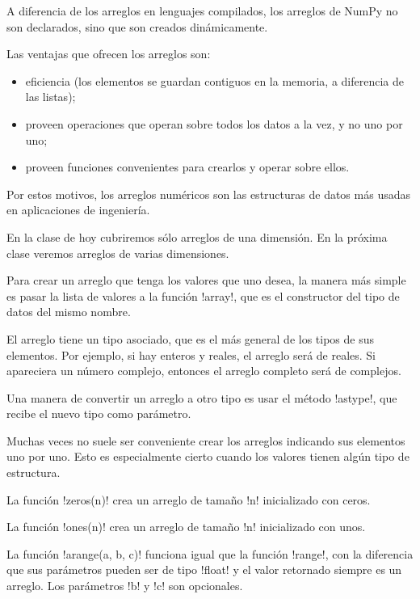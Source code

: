 \documentclass[10pt]{article}
\begin{document}
  A diferencia de los arreglos en lenguajes compilados,
  los arreglos de NumPy no son declarados,
  sino que son creados dinámicamente.

  Las ventajas que ofrecen los arreglos son:
  \begin{itemize}
    \item eficiencia (los elementos se guardan contiguos
      en la memoria, a diferencia de las listas);
    \item proveen operaciones que operan
      sobre todos los datos a la vez,
      y no uno por uno;
    \item proveen funciones convenientes
      para crearlos y operar sobre ellos.
  \end{itemize}
  Por estos motivos,
  los arreglos numéricos son las estructuras de datos
  más usadas en aplicaciones de ingeniería.

  En la clase de hoy
  cubriremos sólo arreglos de una dimensión.
  En la próxima clase veremos arreglos
  de varias dimensiones.


  Para crear un arreglo
  que tenga los valores que uno desea,
  la manera más simple es
  pasar la lista de valores
  a la función \li!array!,
  que es el constructor del tipo de datos
  del mismo nombre.

  El arreglo tiene un tipo asociado,
  que es el más general de los tipos
  de sus elementos.
  Por ejemplo,
  si hay enteros y reales,
  el arreglo será de reales.
  Si apareciera un número complejo,
  entonces el arreglo completo será de complejos.

  Una manera de convertir un arreglo a otro tipo
  es usar el método \li!astype!,
  que recibe el nuevo tipo como parámetro.


  Muchas veces no suele ser conveniente
  crear los arreglos indicando sus elementos
  uno por uno.
  Esto es especialmente cierto
  cuando los valores tienen
  algún tipo de estructura.

  La función \li!zeros(n)!
  crea un arreglo de tamaño \li!n!
  inicializado con ceros.

  La función \li!ones(n)!
  crea un arreglo de tamaño \li!n!
  inicializado con unos.

  La función \li!arange(a, b, c)!
  funciona igual que la función \li!range!,
  con la diferencia que sus parámetros
  pueden ser de tipo \li!float!
  y el valor retornado siempre es un arreglo.
  Los parámetros \li!b! y \li!c!
  son opcionales.
\end{document}
